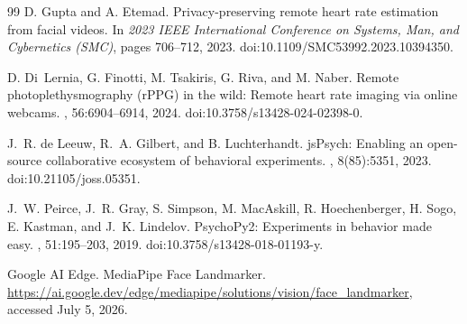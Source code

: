 \documentclass[dvipdfmx]{ehis}
\begin{document}
{\begin{thebibliography}{99}
D. Gupta and A. Etemad.
\newblock Privacy-preserving remote heart rate estimation from facial videos.
\newblock In {\em 2023 IEEE International Conference on Systems, Man, and Cybernetics (SMC)}, pages 706--712, 2023.
\newblock doi:10.1109/SMC53992.2023.10394350.

D. Di~Lernia, G. Finotti, M. Tsakiris, G. Riva, and M. Naber.
\newblock Remote photoplethysmography (rPPG) in the wild: Remote heart rate imaging via online webcams.
, 56:6904--6914, 2024.
\newblock doi:10.3758/s13428-024-02398-0.

J.~R. de Leeuw, R.~A. Gilbert, and B. Luchterhandt.
\newblock jsPsych: Enabling an open-source collaborative ecosystem of behavioral experiments.
, 8(85):5351, 2023.
\newblock doi:10.21105/joss.05351.

J.~W. Peirce, J.~R. Gray, S. Simpson, M. MacAskill, R. Hoechenberger, H. Sogo, E. Kastman, and J.~K. Lindelov.
\newblock PsychoPy2: Experiments in behavior made easy.
, 51:195--203, 2019.
\newblock doi:10.3758/s13428-018-01193-y.

Google AI Edge.
\newblock MediaPipe Face Landmarker.
\newblock \url{https://ai.google.dev/edge/mediapipe/solutions/vision/face_landmarker}, accessed July 5, 2026.

\end{thebibliography}
}

\begin{biography}
\end{biography}
\end{document}
